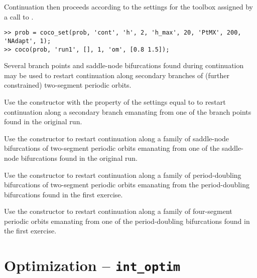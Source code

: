 Continuation then proceeds according to the settings for the  toolbox assigned by a call to .
\begin{lstlisting}[language=coco-highlight]
>> prob = coco_set(prob, 'cont', 'h', 2, 'h_max', 20, 'PtMX', 200, 'NAdapt', 1);
>> coco(prob, 'run1', [], 1, 'om', [0.8 1.5]);
\end{lstlisting}
Several branch points and saddle-node bifurcations found during continuation may be used to restart continuation along secondary branches of (further constrained) two-segment periodic orbits.\\
\medskip

\begin{exercises}

\item Use the  constructor with the  property of the  settings equal to  to restart continuation along a secondary branch emanating from one of the branch points found in the original run.

\item Use the  constructor to restart continuation along a family of saddle-node bifurcations of two-segment periodic orbits emanating from one of the saddle-node bifurcations found in the original run.

\item Use the  constructor to restart continuation along a family of period-doubling bifurcations of two-segment periodic orbits emanating from the period-doubling bifurcations found in the first exercise.

\item Use the  constructor to restart continuation along a family of four-segment periodic orbits emanating from one of the period-doubling bifurcations found in the first exercise.

\end{exercises}

\section{Optimization -- \texttt{int\_optim}}

